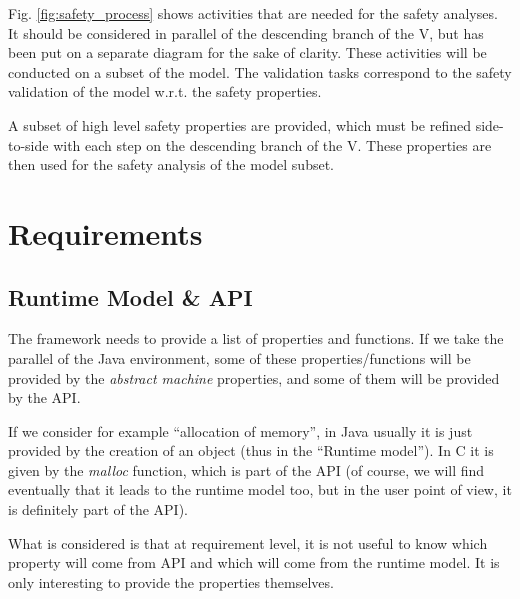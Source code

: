 \documentclass{template/openetcs_article}
\begin{document}
Fig. \ref{fig:safety_process} shows activities that are needed for the safety analyses. It should 
be considered in parallel of the descending branch of the V, but has been put on a separate diagram for
the sake of clarity. These activities will be conducted on a subset of the model.
The validation tasks correspond to the safety validation of the model w.r.t. 
the safety properties.

A subset of high level safety properties are provided, 
which must be refined side-to-side with each step on the 
descending branch of the V. These properties are then used for the safety analysis of the model subset.

\section{Requirements}
\subsection{Runtime Model \& API}
\label{RTMAPI}
The framework needs to provide a list of properties and functions. If we take the parallel of the Java environment, 
some of these properties/functions will be provided by the \emph{abstract machine} properties, and some of them will 
be provided by the API.

If we consider for example ``allocation of memory'', in Java usually it is just provided by the creation of an object 
(thus in the ``Runtime model''). In C it is given by the \emph{malloc} function, which is part of the API (of course, 
we will find eventually that it leads to the runtime model too, but in the user point of view, it is
definitely part of the API).

What is considered is that at requirement level, it is not useful to know which property will come from API and which will 
come from the runtime model. It is only interesting to provide the properties themselves.
\end{document}
